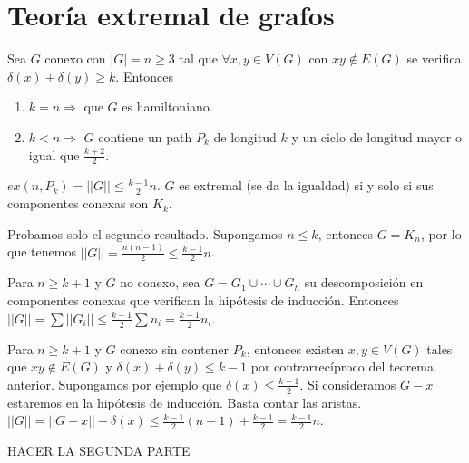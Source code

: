 \documentclass[TGyGC.tex]{subfiles}
\begin{document}
\chapter{Teoría extremal de grafos}

\begin{teorema}
Sea $G$ conexo con $|G|=n\geq 3$ tal que $\forall x, y\in V(G)$ con $xy\notin E(G)$ se verifica $\delta(x)+\delta(y)\geq k$. Entonces 

\begin{enumerate}
\item $k=n\Rightarrow$ que $G$ es hamiltoniano.
\item $k<n\Rightarrow$ $G$ contiene un path $P_k$ de longitud $k$ y un ciclo de longitud mayor o igual que $\frac{k+2}{2}$. 
\end{enumerate}
\end{teorema}

\begin{teorema}
$ex(n,P_k)=||G||\leq\frac{k-1}{2}n$. $G$ es extremal (se da la igualdad) si y solo si sus componentes conexas son $K_k$. 
\end{teorema}

\begin{dem}
Probamos solo el segundo resultado. Supongamos $n\leq k$, entonces $G=K_n$, por lo que tenemos $||G||=\frac{n(n-1)}{2}\leq\frac{k-1}{2}n$.

Para $n\geq k+1$ y $G$ no conexo, sea $G=G_1\cup\cdots \cup G_h$ su descomposición en componentes conexas que verifican la hipótesis de inducción. Entonces $||G||=\sum||G_i||\leq\frac{k-1}{2}\sum n_i=\frac{k-1}{2}n_i$.

Para $n\geq k+1$ y $G$ conexo sin contener $P_k$, entonces existen $x,y\in V(G)$ tales que $xy\notin E(G)$ y $\delta(x)+\delta(y)\leq k-1$ por contrarrecíproco del teorema anterior. Supongamos por ejemplo que $\delta(x)\leq\frac{k-1}{2}$. Si consideramos $G-x$ estaremos en la hipótesis de inducción. Basta contar las aristas. $||G||=||G-x||+\delta(x)\leq\frac{k-1}{2}(n-1)+\frac{k-1}{2}=\frac{k-1}{2}n$.

HACER LA SEGUNDA PARTE


\end{dem}
\end{document}
